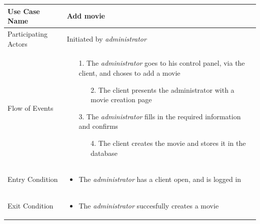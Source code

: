 \begin{center}
	\begin{tabular}{ | l | p{10cm} |  }
		 \hline
		Use Case Name & Add movie \\ \hline
		Participating Actors & Initiated by \emph{administrator} \\ \hline
		Flow of Events & \begin{enumerate}
						\item[1.] The \emph{administrator} goes to his control panel, via the client, and choses to add a movie
						\begin{enumerate}
							\item[2.] The client presents the administrator with a movie creation page
						\end{enumerate}
						\item[3.] The \emph{administrator} fills in the required information and confirms
						\begin{enumerate}
							\item[4.] The client creates the movie and stores it in the database
						\end{enumerate}
					\end{enumerate} \\ \hline
		Entry Condition & \begin{itemize}
						\item The \emph{administrator} has a client open, and is logged in
					\end{itemize} \\ \hline
		Exit Condition & \begin{itemize}
						\item The \emph{administrator} succesfully creates a movie
					\end{itemize} \\
		\hline
	\end{tabular}
\end{center}

